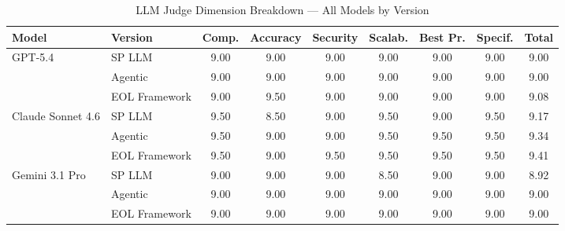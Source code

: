 \begin{table}[htbp]
\centering
\caption{LLM Judge Dimension Breakdown — All Models by Version}
\label{tab:judge_breakdown_combined}
\begin{tabular}{llccccccc}
\toprule
Model & Version & Comp. & Accuracy & Security & Scalab. & Best Pr. & Specif. & Total \\
\midrule
GPT-5.4 & SP LLM & 9.00 & 9.00 & 9.00 & 9.00 & 9.00 & 9.00 & 9.00 \\
 & Agentic & 9.00 & 9.00 & 9.00 & 9.00 & 9.00 & 9.00 & 9.00 \\
 & EOL Framework & 9.00 & 9.50 & 9.00 & 9.00 & 9.00 & 9.00 & 9.08 \\
\midrule
Claude Sonnet 4.6 & SP LLM & 9.50 & 8.50 & 9.00 & 9.50 & 9.00 & 9.50 & 9.17 \\
 & Agentic & 9.50 & 9.00 & 9.00 & 9.50 & 9.50 & 9.50 & 9.34 \\
 & EOL Framework & 9.50 & 9.00 & 9.50 & 9.50 & 9.50 & 9.50 & 9.41 \\
\midrule
Gemini 3.1 Pro & SP LLM & 9.00 & 9.00 & 9.00 & 8.50 & 9.00 & 9.00 & 8.92 \\
 & Agentic & 9.00 & 9.00 & 9.00 & 9.00 & 9.00 & 9.00 & 9.00 \\
 & EOL Framework & 9.00 & 9.00 & 9.00 & 9.00 & 9.00 & 9.00 & 9.00 \\
\bottomrule
\end{tabular}
\end{table}